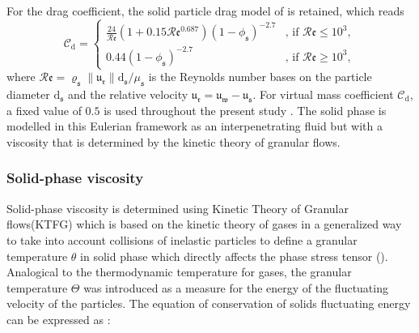 \documentclass[11pt]{report}
\begin{document}
%
For the drag coefficient, the solid particle drag model of \citet{wen1966generalized} is retained, which reads
\begin{equation}
\mathcal{C}_{\mathrm{d}}=
\begin{cases}
\frac{24}{\mathcal{R}\mathfrak{e}}\left(1+0.15\mathcal{R}\mathfrak{e}^{0.687}\right)\left(1-\phi_{\mathfrak{s}}\right)^{-2.7}&\text{, if } \mathcal{R}\mathfrak{e}\le 10^3,\\
0.44\left(1-\phi_{\mathfrak{s}}\right)^{-2.7} &\text{, if } \mathcal{R}\mathfrak{e}\ge 10^3,
\end{cases}
\end{equation}
where $\mathcal{R}\mathfrak{e}=\varrho_{\mathfrak{s}}\|\mathfrak{u}_{\mathfrak{r}}\|\mathrm{d}_{\mathfrak{s}}/\mu_{\mathfrak{s}}$ is the Reynolds number bases on the particle diameter $\mathrm{d}_{\mathfrak{s}}$ and the relative velocity $\boldsymbol{\mathfrak{u}}_{\mathfrak{r}}=\boldsymbol{\mathfrak{u}}_{\mathfrak{w}}-\boldsymbol{\mathfrak{u}}_{\mathfrak{s}}$. For virtual mass coefficient 
$\mathcal{C}_{\mathrm{d}}$, a fixed value of $0.5$ is used throughout the present study \cite{auton1988force}.
The solid phase is modelled in this Eulerian framework as an interpenetrating fluid but with a viscosity that is determined by the kinetic theory of granular flows.
%
\subsubsection{Solid-phase viscosity}
%
Solid-phase viscosity is determined using Kinetic Theory of Granular flows(KTFG) which is based on the kinetic theory of gases 
%
in a generalized way to take into account collisions of inelastic particles to define a granular temperature $\theta$ in solid phase which directly affects the phase stress tensor (\cite{Gonzalez-2017}). 
%
Analogical to the thermodynamic temperature for gases, the granular temperature $\Theta$ was introduced as a measure for the energy of the fluctuating velocity of the particles.
%
The equation of conservation of solids fluctuating energy can be expressed as \cite{Wang-2013}: 
\end{document}
